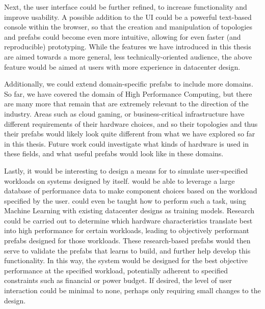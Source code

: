 \documentclass[11pt]{article}
\begin{document}
		Next, the \opendc{} user interface could be further refined, to increase functionality and improve usability.
		A possible addition to the UI could be a powerful text-based console within the browser, so that the creation and manipulation of topologies and prefabs could become even more intuitive, allowing for even faster (and reproducible) prototyping.
		While the features we have introduced in this thesis are aimed towards a more general, less technically-oriented audience, the above feature would be aimed at users with more experience in datacenter design.

		Additionally, we could extend domain-specific prefabs to include more domains.
		So far, we have covered the domain of High Performance Computing, but there are many more that remain that are extremely relevant to the direction of the industry.
		Areas such as cloud gaming, or business-critical infrastructure have different requirements of their hardware choices, and so their topologies and thus their prefabs would likely look quite different from what we have explored so far in this thesis.
		Future work could investigate what kinds of hardware is used in these fields, and what useful prefabs would look like in these domains.

		Lastly, it would be interesting to design a means for \opendc{} to simulate user-specified workloads on systems designed by \opendc{} itself. 
		\opendc{} would be able to leverage a large database of performance data to make component choices based on the workload specified by the user. 
		\opendc{} could even be taught how to perform such a task, using Machine Learning with existing datacenter designs as training models.
		Research could be carried out to determine which hardware characteristics translate best into high performance for certain workloads, leading to objectively performant prefabs designed for those workloads.
		These research-based prefabs would then serve to validate the prefabs that \opendc{} learns to build, and further help develop this functionality.
		In this way, the system would be designed for the best objective performance at the specified workload, potentially adherent to specified constraints such as financial or power budget.
		If desired, the level of user interaction could be minimal to none, perhaps only requiring small changes to the design.
\end{document}
